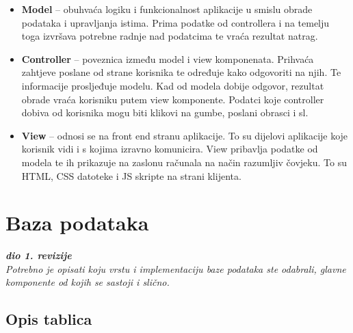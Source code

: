 \begin{itemize}
\item \textbf{Model} – obuhvaća logiku i funkcionalnost aplikacije u smislu obrade podataka i upravljanja istima. Prima podatke od controllera i na temelju toga izvršava potrebne radnje nad podatcima te vraća rezultat natrag.

\item \textbf{Controller} – poveznica između model i view komponenata. Prihvaća zahtjeve poslane od strane korisnika te određuje kako odgovoriti na njih. Te informacije prosljeđuje modelu. Kad od modela dobije odgovor, rezultat obrade vraća korisniku putem view komponente. Podatci koje controller dobiva od korisnika mogu biti klikovi na gumbe, poslani obrasci i sl.

\item \textbf{View} – odnosi se na front end stranu aplikacije. To su dijelovi aplikacije koje korisnik vidi i s kojima izravno komunicira. View pribavlja podatke od modela te ih prikazuje na zaslonu računala na način razumljiv čovjeku. To su HTML, CSS datoteke i JS skripte na strani klijenta. 
\end{itemize}		
				
		\section{Baza podataka}
			
			\textbf{\textit{dio 1. revizije}}\\
			
			\textit{Potrebno je opisati koju vrstu i implementaciju baze podataka ste odabrali, glavne komponente od kojih se sastoji i slično.}
		
			\subsection{Opis tablica}
			
